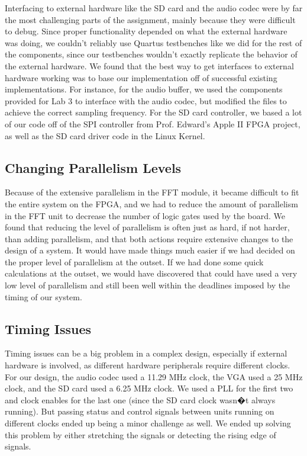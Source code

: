 \documentclass{article}
\begin{document}
Interfacing to external hardware like the SD card and the audio codec were by far the 
most challenging parts of the assignment, mainly because they were difficult to 
debug. Since proper functionality depended on what the external hardware was 
doing, we couldn't reliably use Quartus testbenches like we did for the rest of the 
components, since our testbenches wouldn't exactly replicate the behavior of the 
external hardware. We found that the best way to get interfaces to external hardware 
working was to base our implementation off of successful existing implementations. 
For instance, for the audio buffer, we used the components provided for Lab 3 to 
interface with the audio codec, but modified the files to achieve the correct sampling 
frequency. For the SD card controller, we based a lot of our code off of the SPI 
controller from Prof. Edward's Apple II FPGA project, as well as the SD card driver 
code in the Linux Kernel. 

\subsection{Changing Parallelism Levels}

Because of the extensive parallelism in the FFT module, it became difficult to fit the 
entire system on the FPGA, and we had to reduce the amount of parallelism in the 
FFT unit to decrease the number of logic gates used by the board. We found that 
reducing the level of parallelism is often just as hard, if not harder, than adding 
parallelism, and that both actions require extensive changes to the design of a 
system. It would have made things much easier if we had decided on the proper level 
of parallelism at the outset. If we had done some quick calculations at the outset, we 
would have discovered that could have used a very low level of parallelism and still 
been well within the deadlines imposed by the timing of our system.

\subsection{Timing Issues}

Timing issues can be a big problem in a complex design, especially if external 
hardware is involved, as different hardware peripherals require different clocks. For 
our design, the audio codec used a 11.29 MHz clock, the VGA used a 25 MHz clock, 
and the SD card used a 6.25 MHz clock. We used a PLL for the first two and clock 
enables for the last one (since the SD card clock wasn�t always running). But passing 
status and control signals between units running on different clocks ended up being a 
minor challenge as well. We ended up solving this problem by either stretching the 
signals or detecting the rising edge of signals. 
\end{document}
